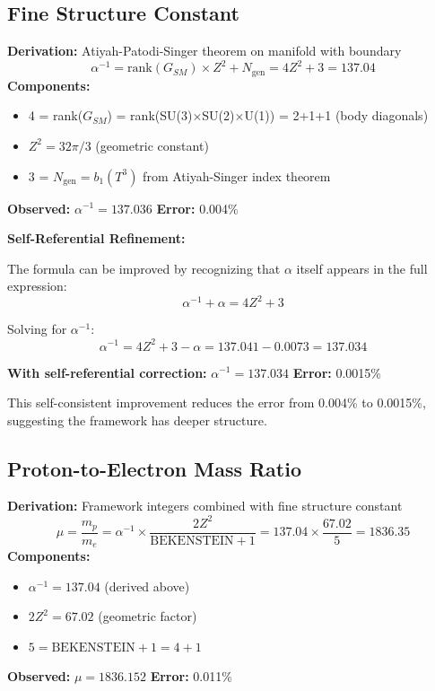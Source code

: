 \documentclass[12pt,a4paper]{article}
\newcommand{\Tthree}{T^3}
\newcommand{\Zsq}{Z^2}
\newcommand{\BEKENSTEIN}{\text{BEKENSTEIN}}
\newcommand{\Ngen}{N_{\text{gen}}}
\begin{document}
\subsection{Fine Structure Constant}

\begin{derivedbox}
\textbf{Derivation:} Atiyah-Patodi-Singer theorem on manifold with boundary
\begin{equation}
\alpha^{-1} = \text{rank}(G_{SM}) \times \Zsq + \Ngen = 4\Zsq + 3 = 137.04
\end{equation}
\textbf{Components:}
\begin{itemize}
    \item 4 = rank($G_{SM}$) = rank(SU(3)$\times$SU(2)$\times$U(1)) = 2+1+1 (body diagonals)
    \item $\Zsq = 32\pi/3$ (geometric constant)
    \item 3 = $\Ngen = b_1(\Tthree)$ from Atiyah-Singer index theorem
\end{itemize}
\textbf{Observed:} $\alpha^{-1} = 137.036$ \quad \textbf{Error:} 0.004\%
\end{derivedbox}

\textbf{Self-Referential Refinement:}

The formula can be improved by recognizing that $\alpha$ itself appears in the full expression:
\begin{equation}
\alpha^{-1} + \alpha = 4\Zsq + 3
\end{equation}

Solving for $\alpha^{-1}$:
\begin{equation}
\alpha^{-1} = 4\Zsq + 3 - \alpha = 137.041 - 0.0073 = 137.034
\end{equation}

\textbf{With self-referential correction:} $\alpha^{-1} = 137.034$ \quad \textbf{Error:} 0.0015\%

This self-consistent improvement reduces the error from 0.004\% to 0.0015\%, suggesting the framework has deeper structure.

\subsection{Proton-to-Electron Mass Ratio}

\begin{derivedbox}
\textbf{Derivation:} Framework integers combined with fine structure constant
\begin{equation}
\mu = \frac{m_p}{m_e} = \alpha^{-1} \times \frac{2\Zsq}{\BEKENSTEIN+1} = 137.04 \times \frac{67.02}{5} = 1836.35
\end{equation}
\textbf{Components:}
\begin{itemize}
    \item $\alpha^{-1} = 137.04$ (derived above)
    \item $2\Zsq = 67.02$ (geometric factor)
    \item $5 = \BEKENSTEIN + 1 = 4 + 1$
\end{itemize}
\textbf{Observed:} $\mu = 1836.152$ \quad \textbf{Error:} 0.011\%
\end{derivedbox}
\end{document}
